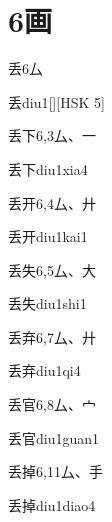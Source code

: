 
\section*{6画}

\begin{entry}{丢}{6}{⼛}
  \begin{phonetics}{丢}{diu1}[][HSK 5]
  \end{phonetics}
\end{entry}

\begin{entry}{丢下}{6,3}{⼛、⼀}
  \begin{phonetics}{丢下}{diu1xia4}
  \end{phonetics}
\end{entry}

\begin{entry}{丢开}{6,4}{⼛、⼶}
  \begin{phonetics}{丢开}{diu1kai1}
  \end{phonetics}
\end{entry}

\begin{entry}{丢失}{6,5}{⼛、⼤}
  \begin{phonetics}{丢失}{diu1shi1}
  \end{phonetics}
\end{entry}

\begin{entry}{丢弃}{6,7}{⼛、⼶}
  \begin{phonetics}{丢弃}{diu1qi4}
  \end{phonetics}
\end{entry}

\begin{entry}{丢官}{6,8}{⼛、⼧}
  \begin{phonetics}{丢官}{diu1guan1}
  \end{phonetics}
\end{entry}

\begin{entry}{丢掉}{6,11}{⼛、⼿}
  \begin{phonetics}{丢掉}{diu1diao4}
  \end{phonetics}
\end{entry}

